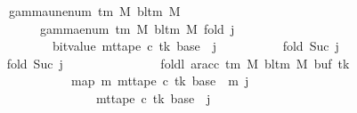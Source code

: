 \begin{isabellebody}
\ \ \ \ \ \ \ \ {\isachardoublequoteopen}gamma{\isacharunderscore}{\kern0pt}unenum\ {\isacharparenleft}{\kern0pt}{\isasymGamma}{\isacharunderscore}{\kern0pt}tm\ M{\isacharparenright}{\kern0pt}\ {\isacharparenleft}{\kern0pt}bl{\isacharunderscore}{\kern0pt}tm\ M{\isacharparenright}{\kern0pt}\isanewline
\ \ \ \ \ \ \ \ \ \ \ {\isacharparenleft}{\kern0pt}{}\ {\isacharasterisk}{\kern0pt}\ gamma{\isacharunderscore}{\kern0pt}enum\ {\isacharparenleft}{\kern0pt}{\isasymGamma}{\isacharunderscore}{\kern0pt}tm\ M{\isacharparenright}{\kern0pt}\ {\isacharparenleft}{\kern0pt}bl{\isacharunderscore}{\kern0pt}tm\ M{\isacharparenright}{\kern0pt}\ {\isacharparenleft}{\kern0pt}{\isacharquery}{\kern0pt}fold\ j{\isacharparenright}{\kern0pt}\isanewline
\ \ \ \ \ \ \ \ \ \ \ \ \ \ {\isacharplus}{\kern0pt}\ bit{\isacharunderscore}{\kern0pt}value\ {\isacharparenleft}{\kern0pt}mt{\isacharunderscore}{\kern0pt}tape\ c{\isacharprime}{\kern0pt}\ tk\ {\isacharparenleft}{\kern0pt}base\ {\isacharplus}{\kern0pt}\ j{\isacharparenright}{\kern0pt}{\isacharparenright}{\kern0pt}{\isacharparenright}{\kern0pt}\isanewline
\ \ \ \ \ \ \ \ \ {\isacharequal}{\kern0pt}\ {\isacharquery}{\kern0pt}fold\ {\isacharparenleft}{\kern0pt}Suc\ j{\isacharparenright}{\kern0pt}{\isachardoublequoteclose}\isanewline
\ \ \ \ \isamarkupfalse%
\ {\isacharminus}{\kern0pt}\isanewline
\ \ \ \ \ \ \isamarkupfalse%
\ {\isachardoublequoteopen}{\isacharquery}{\kern0pt}fold\ {\isacharparenleft}{\kern0pt}Suc\ j{\isacharparenright}{\kern0pt}\isanewline
\ \ \ \ \ \ \ \ \ \ \ \ \ \ {\isacharequal}{\kern0pt}\ foldl\ {\isacharparenleft}{\kern0pt}ar{\isacharunderscore}{\kern0pt}acc\ {\isacharparenleft}{\kern0pt}{\isasymGamma}{\isacharunderscore}{\kern0pt}tm\ M{\isacharparenright}{\kern0pt}\ {\isacharparenleft}{\kern0pt}bl{\isacharunderscore}{\kern0pt}tm\ M{\isacharparenright}{\kern0pt}{\isacharparenright}{\kern0pt}\ {\isacharparenleft}{\kern0pt}buf{}\ tk{\isacharparenright}{\kern0pt}\isanewline
\ \ \ \ \ \ \ \ \ \ \ \ \ \ \ \ \ \ {\isacharparenleft}{\kern0pt}map\ {\isacharparenleft}{\kern0pt}{\isasymlambda}m{\isachardot}{\kern0pt}\ mt{\isacharunderscore}{\kern0pt}tape\ c{\isacharprime}{\kern0pt}\ tk\ {\isacharparenleft}{\kern0pt}base\ {\isacharplus}{\kern0pt}\ m{\isacharparenright}{\kern0pt}{\isacharparenright}{\kern0pt}\ {\isacharbrackleft}{\kern0pt}{}{\isachardot}{\kern0pt}{\isachardot}{\kern0pt}{\isacharless}{\kern0pt}j{\isacharbrackright}{\kern0pt}\isanewline
\ \ \ \ \ \ \ \ \ \ \ \ \ \ \ \ \ \ \ \ \ {\isacharat}{\kern0pt}\ {\isacharbrackleft}{\kern0pt}mt{\isacharunderscore}{\kern0pt}tape\ c{\isacharprime}{\kern0pt}\ tk\ {\isacharparenleft}{\kern0pt}base\ {\isacharplus}{\kern0pt}\ j{\isacharparenright}{\kern0pt}{\isacharbrackright}{\kern0pt}{\isacharparenright}{\kern0pt}{\isachardoublequoteclose}\isanewline

\end{isabellebody}
